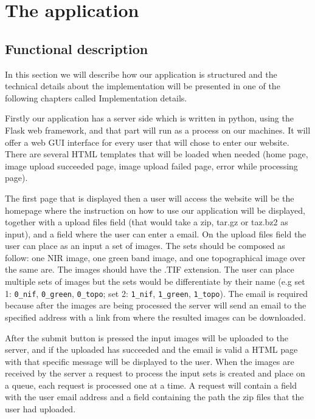 \documentclass[12pt, a4paper]{report}
\begin{document}
\newpage
\chapter{The application}

\section{Functional description}

\quad 
In this section we will describe how our application is structured and the technical details about the implementation will be presented in one of the following chapters called Implementation details. 
\par 

Firstly our application has a server side which is written in python, using the Flask web framework, and that part will run as a process on our machines. It will offer a web GUI interface for every user that will chose to enter our website. There are several HTML templates that will be loaded when needed (home page, image upload succeeded page, image upload failed page, error while processing page). 
\par 

The first page that is displayed then a user will access the website will be the homepage where the instruction on how to use our application will be displayed, together with a upload files field (that would take a zip, tar.gz or taz.bz2 as input), and a field where the user can enter a email. On the upload files field the user can place as an input a set of images. The sets should be composed as follow: one NIR image, one green band image, and one topographical image over the same are. The images should have the .TIF extension. The user can place multiple sets of images but the sets would be differentiate by their name (e.g set 1: \texttt{0\_nif}, \texttt{0\_green}, \texttt{0\_topo}; set 2: \texttt{1\_nif}, \texttt{1\_green}, \texttt{1\_topo}). The email is required because after the images are being processed the server will send an email to the specified address with a link from where the resulted images can be downloaded.
\par 

After the submit button is pressed the input images will be uploaded to the server, and if the uploaded has succeeded and the email is valid a HTML page with that specific message will be displayed to the user. When the images are received by the server a request to process the input sets is created and place on a queue, each request is processed one at a time. A request will contain a field with the user email address and a field containing the path the zip files that the user had uploaded.
\par 
\end{document}
